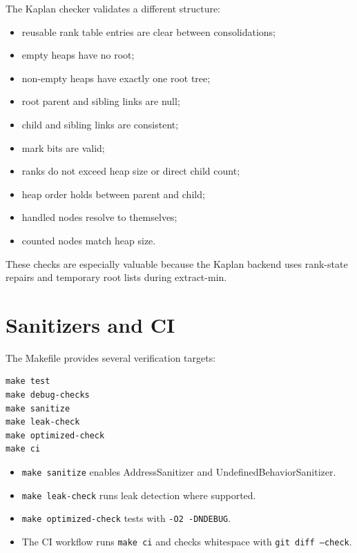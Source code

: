 The Kaplan checker validates a different structure:

\begin{itemize}
    \item reusable rank table entries are clear between consolidations;
    \item empty heaps have no root;
    \item non-empty heaps have exactly one root tree;
    \item root parent and sibling links are null;
    \item child and sibling links are consistent;
    \item mark bits are valid;
    \item ranks do not exceed heap size or direct child count;
    \item heap order holds between parent and child;
    \item handled nodes resolve to themselves;
    \item counted nodes match heap size.
\end{itemize}

These checks are especially valuable because the Kaplan backend uses rank-state repairs and temporary root lists during extract-min.

\section{Sanitizers and CI}

The Makefile provides several verification targets:

\begin{lstlisting}[style=shellstyle, caption={Verification targets.}]
make test
make debug-checks
make sanitize
make leak-check
make optimized-check
make ci
\end{lstlisting}

\begin{itemize}
    \item \texttt{make sanitize} enables AddressSanitizer and UndefinedBehaviorSanitizer.
    \item \texttt{make leak-check} runs leak detection where supported.
    \item \texttt{make optimized-check} tests with \texttt{-O2 -DNDEBUG}.
    \item The CI workflow runs \texttt{make ci} and checks whitespace with \texttt{git diff --check}.
\end{itemize}
